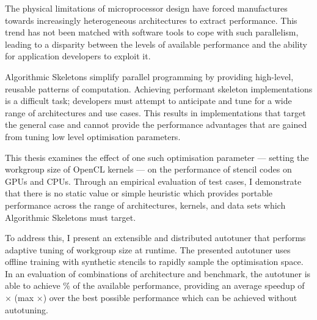 The physical limitations of microprocessor design have forced
manufactures towards increasingly heterogeneous architectures to
extract performance. This trend has not been matched with software
tools to cope with such parallelism, leading to a disparity between
the levels of available performance and the ability for application
developers to exploit it.

Algorithmic Skeletons simplify parallel programming by providing
high-level, reusable patterns of computation. Achieving performant
skeleton implementations is a difficult task; developers must attempt
to anticipate and tune for a wide range of architectures and use
cases. This results in implementations that target the general case
and cannot provide the performance advantages that are gained from
tuning low level optimisation parameters.

This thesis examines the effect of one such optimisation parameter ---
setting the workgroup size of OpenCL kernels --- on the performance of
stencil codes on GPUs and CPUs. Through an empirical evaluation of
 test cases, I demonstrate that there is
no static value or simple heuristic which provides portable
performance across the range of architectures, kernels, and data sets
which Algorithmic Skeletons must target.

To address this, I present an extensible and distributed autotuner
that performs adaptive tuning of workgroup size at runtime. The
presented autotuner uses offline training with synthetic stencils to
rapidly sample the optimisation space. In an evaluation of
 combinations of architecture and benchmark,
the autotuner is able to achieve
$\%$ of the available
performance, providing an average speedup of
$\times$ (max
$\times$) over the best
possible performance which can be achieved without autotuning.

